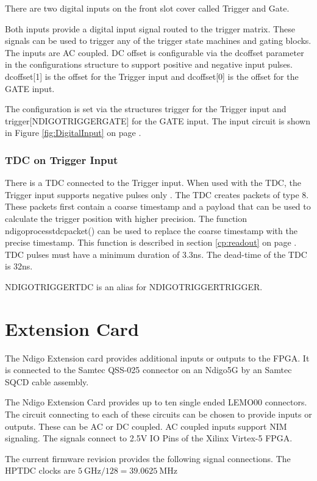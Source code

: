 		There are two digital inputs on the front slot cover called Trigger and Gate.\par
		Both inputs provide a digital input signal routed to the trigger matrix. These signals can be used to trigger any of the trigger state machines and gating blocks. The inputs are AC coupled. DC offset is configurable via the \textsf{dc\tu offset} parameter in the configurations structure to support positive and negative input pulses. \textsf{dc\tu offset[1]} is the offset for the Trigger input and \textsf{dc\tu offset[0]} is the offset for the GATE input.\par
		The configuration is set via the structures \textsf{trigger} for the Trigger input and \textsf{trigger[NDIGO\tu TRIGGER\tu GATE]} for the GATE input. The input circuit is shown in Figure \ref{fig:DigitalInput} on page \pageref{fig:DigitalInput}.
		
		\subsubsection{TDC on Trigger Input}
		
			There is a TDC connected to the Trigger input. When used with the TDC, the Trigger input supports negative pulses only . The TDC creates packets of type 8. These packets first contain a coarse timestamp and a payload that can be used to calculate the trigger position with higher precision. The function \textsf{ndigo\tu process\tu tdc\tu packet()} can be used to replace the coarse timestamp with the precise timestamp. This function is described in section \ref{cp:readout} on page \pageref{cp:readout}.
			TDC pulses must have a minimum duration of 3.3ns. The dead-time of the TDC is 32ns.

			\textsf{NDIGO\tu TRIGGER\tu TDC} is an alias for \textsf{NDIGO\tu TRIGGER\tu TRIGGER}.


\section{Extension Card\label{cp:extcard}}

	The Ndigo Extension card provides additional inputs or outputs to the FPGA. It is connected to the Samtec QSS-025 connector on an Ndigo5G by an Samtec SQCD cable assembly.\par
	The Ndigo Extension Card provides up to ten single ended LEMO00 connectors. The circuit connecting to each of these circuits can be chosen to provide inputs or outputs. These can be AC or DC coupled. AC coupled inputs support NIM signaling. The signals connect to 2.5V IO Pins of the Xilinx Virtex-5 FPGA.\par 
	The current firmware revision provides the following signal connections. The HPTDC clocks are $\SI{5}{\giga\hertz} / 128 = \SI{39.0625}{\mega\hertz}$\par
	
